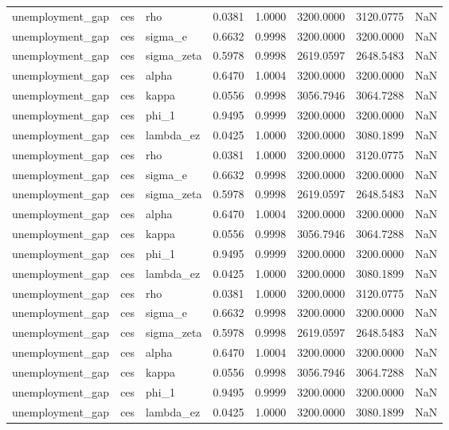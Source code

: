 \begin{tabular}{lllrrrrl}
unemployment\_gap & ces & rho & 0.0381 & 1.0000 & 3200.0000 & 3120.0775 & NaN \\
unemployment\_gap & ces & sigma\_e & 0.6632 & 0.9998 & 3200.0000 & 3200.0000 & NaN \\
unemployment\_gap & ces & sigma\_zeta & 0.5978 & 0.9998 & 2619.0597 & 2648.5483 & NaN \\
unemployment\_gap & ces & alpha & 0.6470 & 1.0004 & 3200.0000 & 3200.0000 & NaN \\
unemployment\_gap & ces & kappa & 0.0556 & 0.9998 & 3056.7946 & 3064.7288 & NaN \\
unemployment\_gap & ces & phi\_1 & 0.9495 & 0.9999 & 3200.0000 & 3200.0000 & NaN \\
unemployment\_gap & ces & lambda\_ez & 0.0425 & 1.0000 & 3200.0000 & 3080.1899 & NaN \\
unemployment\_gap & ces & rho & 0.0381 & 1.0000 & 3200.0000 & 3120.0775 & NaN \\
unemployment\_gap & ces & sigma\_e & 0.6632 & 0.9998 & 3200.0000 & 3200.0000 & NaN \\
unemployment\_gap & ces & sigma\_zeta & 0.5978 & 0.9998 & 2619.0597 & 2648.5483 & NaN \\
unemployment\_gap & ces & alpha & 0.6470 & 1.0004 & 3200.0000 & 3200.0000 & NaN \\
unemployment\_gap & ces & kappa & 0.0556 & 0.9998 & 3056.7946 & 3064.7288 & NaN \\
unemployment\_gap & ces & phi\_1 & 0.9495 & 0.9999 & 3200.0000 & 3200.0000 & NaN \\
unemployment\_gap & ces & lambda\_ez & 0.0425 & 1.0000 & 3200.0000 & 3080.1899 & NaN \\
unemployment\_gap & ces & rho & 0.0381 & 1.0000 & 3200.0000 & 3120.0775 & NaN \\
unemployment\_gap & ces & sigma\_e & 0.6632 & 0.9998 & 3200.0000 & 3200.0000 & NaN \\
unemployment\_gap & ces & sigma\_zeta & 0.5978 & 0.9998 & 2619.0597 & 2648.5483 & NaN \\
unemployment\_gap & ces & alpha & 0.6470 & 1.0004 & 3200.0000 & 3200.0000 & NaN \\
unemployment\_gap & ces & kappa & 0.0556 & 0.9998 & 3056.7946 & 3064.7288 & NaN \\
unemployment\_gap & ces & phi\_1 & 0.9495 & 0.9999 & 3200.0000 & 3200.0000 & NaN \\
unemployment\_gap & ces & lambda\_ez & 0.0425 & 1.0000 & 3200.0000 & 3080.1899 & NaN \\

\end{tabular}
